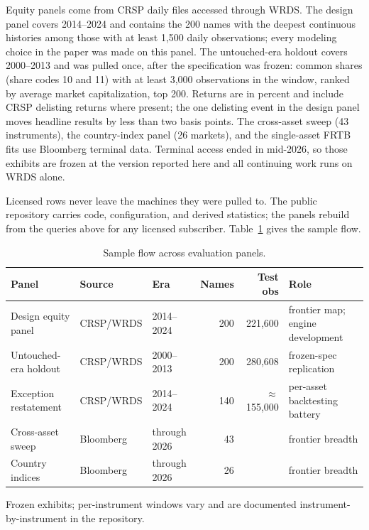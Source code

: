 \documentclass[11pt]{article}
\theoremstyle{remark}
\begin{document}
Equity panels come from CRSP daily files accessed through WRDS. The
design panel covers 2014--2024 and contains the 200 names with the
deepest continuous histories among those with at least 1{,}500 daily
observations; every modeling choice in the paper was made on this
panel. The untouched-era holdout covers 2000--2013 and was pulled once,
after the specification was frozen: common shares (share codes 10 and
11) with at least 3{,}000 observations in the window, ranked by average
market capitalization, top 200. Returns are in percent and include
CRSP delisting returns where present; the one delisting event in the
design panel moves headline results by less than two basis points. The
cross-asset sweep (43 instruments), the country-index panel (26
markets), and the single-asset FRTB fits use Bloomberg terminal data.
Terminal access ended in mid-2026, so those exhibits are frozen at the
version reported here and all continuing work runs on WRDS alone.

Licensed rows never leave the machines they were pulled to. The public
repository carries code, configuration, and derived statistics; the
panels rebuild from the queries above for any licensed subscriber.
Table~\ref{tab:sampleflow} gives the sample flow.

\begin{table}[t]
\centering\small
\begin{threeparttable}
\caption{Sample flow across evaluation panels.}
\label{tab:sampleflow}
\footnotesize\setlength{\tabcolsep}{4pt}
\begin{tabular}{lllrrl}
\toprule
Panel & Source & Era & Names & Test obs & Role \\
\midrule
Design equity panel & CRSP/WRDS & 2014--2024 & 200 & 221{,}600 & frontier map; engine development \\
Untouched-era holdout & CRSP/WRDS & 2000--2013 & 200 & 280{,}608 & frozen-spec replication \\
Exception restatement & CRSP/WRDS & 2014--2024 & 140 & $\approx$155{,}000 & per-asset backtesting battery \\
Cross-asset sweep & Bloomberg & through 2026 & 43 & \tnote{a} & frontier breadth \\
Country indices & Bloomberg & through 2026 & 26 & \tnote{a} & frontier breadth \\
\bottomrule
\end{tabular}
\begin{tablenotes}\footnotesize
\item[a] Frozen exhibits; per-instrument windows vary and are
documented instrument-by-instrument in the repository.
\end{tablenotes}
\end{threeparttable}
\end{table}
\end{document}

